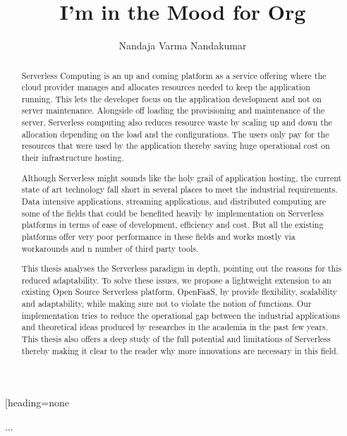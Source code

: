 \documentclass[12pt]{article}
\author{Nandaja Varma Nandakumar}
\date{}
\title{I'm in the Mood for Org}
\begin{document}
\maketitle


\printbibliography[heading=none
\begin{titlepage}
...
\end{titlepage}

\begin{abstract}
Serverless Computing is an up and coming platform as a service offering 
where the cloud provider manages and allocates
resources needed to keep the application running. This lets the developer focus on the application development
and not on server maintenance. Alongside off loading the provisioning and
maintenance of the server, Serverless computing also reduces resource waste
by scaling up and down the allocation depending on the load and the
configurations. The users only pay for the resources that were used by the
application thereby saving huge operational cost on their infrastructure
hosting.

Although Serverless might sounds like the holy grail of application hosting, the 
current state of art technology fall short in several places to meet the industrial
requirements. Data intensive applications, streaming applications, and
distributed computing are some of the fields that could be benefited heavily by
implementation on Serverless platforms in terms of ease of development,
efficiency and cost. But all the existing platforms offer very
poor performance in these fields and works mostly via workarounds and n number
of third party tools.

This thesis analyses the Serverless paradigm in depth,
pointing out the reasons for this reduced adaptability. To solve these issues, we propose a lightweight
extension to an existing Open Source Serverless platform, OpenFaaS, by provide
flexibility, scalability and adaptability, while making sure not to violate the notion
of functions. Our implementation tries to reduce the operational gap between the
industrial applications and theoretical ideas produced by researches in the
academia in the past few years.
This thesis also offers a deep study of the full potential and limitations of
Serverless thereby making it clear to the reader why more innovations are
necessary in this field.

\end{abstract}

\setcounter{tocdepth}{4}
\tableofcontents
\end{document}
